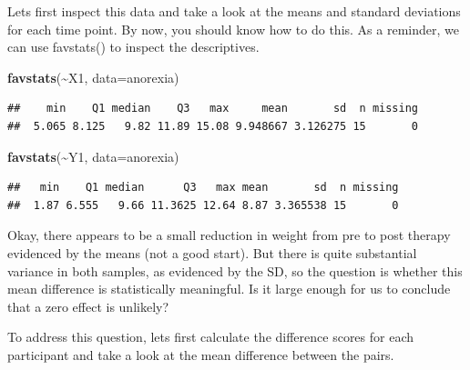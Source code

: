 \documentclass[
]{article}
\newenvironment{Shaded}{\begin{snugshade}}{\end{snugshade}}
\newcommand{\AttributeTok}[1]{\textcolor[rgb]{0.13,0.29,0.53}{#1}}
\newcommand{\FunctionTok}[1]{\textcolor[rgb]{0.13,0.29,0.53}{\textbf{#1}}}
\newcommand{\NormalTok}[1]{#1}
\newcommand{\OtherTok}[1]{\textcolor[rgb]{0.56,0.35,0.01}{#1}}
\newcommand{\SpecialCharTok}[1]{\textcolor[rgb]{0.81,0.36,0.00}{\textbf{#1}}}
\begin{document}
Lets first inspect this data and take a look at the means and standard
deviations for each time point. By now, you should know how to do this.
As a reminder, we can use favstats() to inspect the descriptives.

\begin{Shaded}
\begin{Highlighting}[]
\FunctionTok{favstats}\NormalTok{(}\SpecialCharTok{\textasciitilde{}}\NormalTok{X1, }\AttributeTok{data=}\NormalTok{anorexia)}
\end{Highlighting}
\end{Shaded}

\begin{verbatim}
##    min    Q1 median    Q3   max     mean       sd  n missing
##  5.065 8.125   9.82 11.89 15.08 9.948667 3.126275 15       0
\end{verbatim}

\begin{Shaded}
\begin{Highlighting}[]
\FunctionTok{favstats}\NormalTok{(}\SpecialCharTok{\textasciitilde{}}\NormalTok{Y1, }\AttributeTok{data=}\NormalTok{anorexia)}
\end{Highlighting}
\end{Shaded}

\begin{verbatim}
##   min    Q1 median      Q3   max mean       sd  n missing
##  1.87 6.555   9.66 11.3625 12.64 8.87 3.365538 15       0
\end{verbatim}

Okay, there appears to be a small reduction in weight from pre to post
therapy evidenced by the means (not a good start). But there is quite
substantial variance in both samples, as evidenced by the SD, so the
question is whether this mean difference is statistically meaningful. Is
it large enough for us to conclude that a zero effect is unlikely?

To address this question, lets first calculate the difference scores for
each participant and take a look at the mean difference between the
pairs.

\begin{Shaded}
\end{Shaded}
\end{document}
